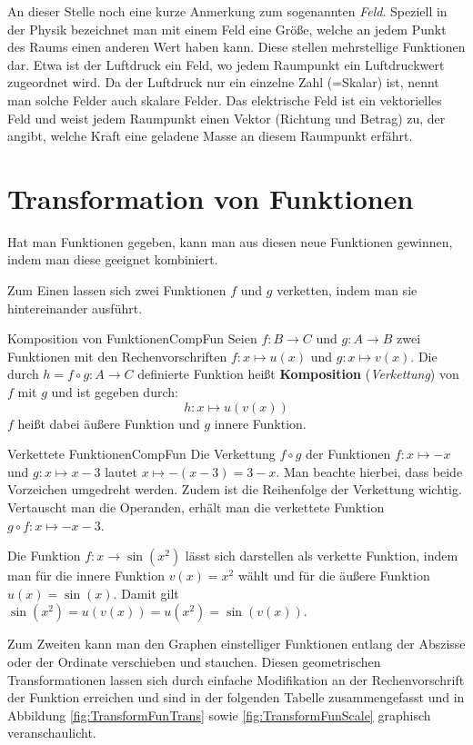 An dieser Stelle noch eine kurze Anmerkung zum sogenannten \emph{Feld}. Speziell in der Physik bezeichnet man mit einem Feld eine Größe, welche an jedem Punkt des Raums einen anderen Wert haben kann. Diese stellen mehrstellige Funktionen dar. Etwa ist der Luftdruck ein Feld, wo jedem Raumpunkt ein Luftdruckwert zugeordnet wird. Da der Luftdruck nur ein einzelne Zahl (=Skalar) ist, nennt man solche Felder auch skalare Felder. Das elektrische Feld ist ein vektorielles Feld und weist jedem Raumpunkt einen Vektor (Richtung und Betrag) zu, der angibt, welche Kraft eine geladene Masse an diesem Raumpunkt erfährt.

\section{Transformation von Funktionen}

Hat man Funktionen gegeben, kann man aus diesen neue Funktionen gewinnen, indem man diese geeignet kombiniert.

Zum Einen lassen sich zwei Funktionen $f$ und $g$ verketten, indem man sie hintereinander ausführt.

\begin{definition}{Komposition von Funktionen}{CompFun}
    Seien $f: B \to C$ und $g: A \to B$ zwei Funktionen mit den Rechenvorschriften $f: x \mapsto u(x)$ und $g: x \mapsto v(x)$. Die durch $h = f \circ g: A \to C$ definierte Funktion heißt \textbf{Komposition} (\emph{Verkettung}) von $f$ mit $g$ und ist gegeben durch:
    $$
        h: x \mapsto u(v(x))
    $$
    $f$ heißt dabei äußere Funktion und $g$ innere Funktion.
\end{definition}

\begin{example}{Verkettete Funktionen}{CompFun}
    Die Verkettung $f \circ g$ der Funktionen $f: x \mapsto -x$ und $g: x \mapsto x-3$ lautet $x \mapsto -(x-3) = 3-x$. Man beachte hierbei, dass beide Vorzeichen umgedreht werden. Zudem ist die Reihenfolge der Verkettung wichtig. Vertauscht man die Operanden, erhält man die verkettete Funktion $g \circ f: x \mapsto -x-3$.

    Die Funktion $f: x \to \sin(x^2)$ lässt sich darstellen als verkette Funktion, indem man für die innere Funktion $v(x) = x^2$ wählt und für die äußere Funktion $u(x) = \sin(x)$. Damit gilt $\sin(x^2) = u(v(x)) = u(x^2) = \sin(v(x))$.
\end{example}

Zum Zweiten kann man den Graphen einstelliger Funktionen entlang der Abszisse oder der Ordinate verschieben und stauchen. Diesen geometrischen Transformationen lassen sich durch einfache Modifikation an der Rechenvorschrift der Funktion erreichen und sind in der folgenden Tabelle zusammengefasst und in Abbildung \ref{fig:TransformFunTrans} sowie \ref{fig:TransformFunScale} graphisch veranschaulicht.

